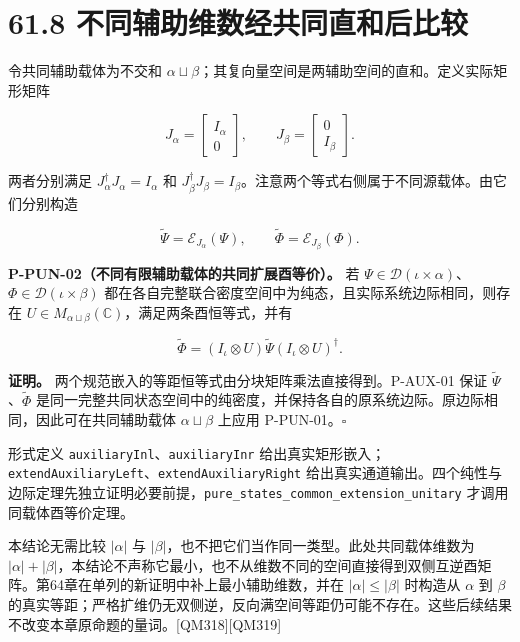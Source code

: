 \documentclass[
  11pt,
  oneside]{book}
\begin{document}
\section{61.8 不同辅助维数经共同直和后比较}

令共同辅助载体为不交和
\(\alpha\sqcup\beta\)；其复向量空间是两辅助空间的直和。定义实际矩形矩阵

\[
J_\alpha=\begin{bmatrix}I_\alpha\\0\end{bmatrix},
\qquad
J_\beta=\begin{bmatrix}0\\I_\beta\end{bmatrix}.
\]

两者分别满足 \(J_\alpha^\dagger J_\alpha=I_\alpha\) 和
\(J_\beta^\dagger J_\beta=I_\beta\)。注意两个等式右侧属于不同源载体。由它们分别构造

\[
\widetilde\Psi=\mathcal E_{J_\alpha}(\Psi),
\qquad
\widetilde\Phi=\mathcal E_{J_\beta}(\Phi).
\]

\protect\hypertarget{p-pun-02}{}{}

\textbf{P-PUN-02（不同有限辅助载体的共同扩展酉等价）。} 若
\(\Psi\in\mathcal D(\iota\times\alpha)\)、\(\Phi\in\mathcal D(\iota\times\beta)\)
都在各自完整联合密度空间中为纯态，且实际系统边际相同，则存在
\(U\in M_{\alpha\sqcup\beta}(\mathbb C)\)，满足两条酉恒等式，并有

\[
\widetilde\Phi
=(I_\iota\otimes U)\widetilde\Psi(I_\iota\otimes U)^\dagger.
\]

\textbf{证明。} 两个规范嵌入的等距恒等式由分块矩阵乘法直接得到。P-AUX-01
保证 \(\widetilde\Psi\)、\(\widetilde\Phi\)
是同一完整共同状态空间中的纯密度，并保持各自的原系统边际。原边际相同，因此可在共同辅助载体
\(\alpha\sqcup\beta\) 上应用 P-PUN-01。\(\square\)

形式定义 \texttt{auxiliary\allowbreak Inl}、\allowbreak \texttt{auxiliary\allowbreak Inr}
给出真实矩形嵌入；\texttt{extend\allowbreak Auxiliary\allowbreak Left}、\allowbreak \texttt{extend\allowbreak Auxiliary\allowbreak Right}
给出真实通道输出。四个纯性与边际定理先独立证明必要前提，\texttt{pure\_\allowbreak states\_\allowbreak common\_\allowbreak extension\_\allowbreak unitary}
才调用同载体酉等价定理。

本结论无需比较 \(|\alpha|\) 与
\(|\beta|\)，也不把它们当作同一类型。此处共同载体维数为
\(|\alpha|+|\beta|\)，本结论不声称它最小，也不从维数不同的空间直接得到双侧互逆酉矩阵。第64章在单列的新证明中补上最小辅助维数，并在
\(|\alpha|\le|\beta|\) 时构造从 \(\alpha\) 到 \(\beta\)
的真实等距；严格扩维仍无双侧逆，反向满空间等距仍可能不存在。这些后续结果不改变本章原命题的量词。{[}QM318{]}{[}QM319{]}
\end{document}
